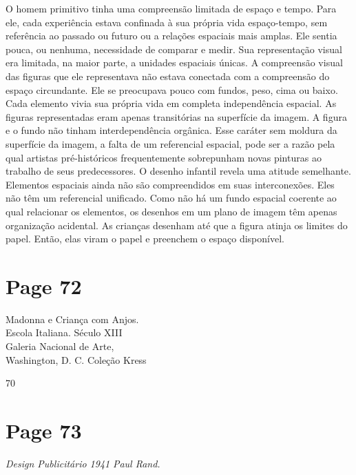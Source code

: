 \documentclass[a4paper]{article}
\begin{document}
O homem primitivo tinha uma compreensão limitada de espaço e tempo. Para ele, cada experiência estava confinada à sua própria vida espaço-tempo, sem referência ao passado ou futuro ou a relações espaciais mais amplas. Ele sentia pouca, ou nenhuma, necessidade de comparar e medir. Sua representação visual era limitada, na maior parte, a unidades espaciais únicas. A compreensão visual das figuras que ele representava não estava conectada com a compreensão do espaço circundante. Ele se preocupava pouco com fundos, peso, cima ou baixo. Cada elemento vivia sua própria vida em completa independência espacial. As figuras representadas eram apenas transitórias na superfície da imagem. A figura e o fundo não tinham interdependência orgânica. Esse caráter sem moldura da superfície da imagem, a falta de um referencial espacial, pode ser a razão pela qual artistas pré-históricos frequentemente sobrepunham novas pinturas ao trabalho de seus predecessores. O desenho infantil revela uma atitude semelhante. Elementos espaciais ainda não são compreendidos em suas interconexões. Eles não têm um referencial unificado. Como não há um fundo espacial coerente ao qual relacionar os elementos, os desenhos em um plano de imagem têm apenas organização acidental. As crianças desenham até que a figura atinja os limites do papel. Então, elas viram o papel e preenchem o espaço disponível.

\vfill
{}

\newpage
\section*{Page 72}

\begin{raggedright}
Madonna e Criança com Anjos. \\
Escola Italiana. Século XIII \\
Galeria Nacional de Arte, \\
Washington, D. C. Coleção Kress
\end{raggedright}
70

\newpage
\section*{Page 73}

\raggedright %

\textit{Design Publicitário 1941}
\textit{Paul Rand.}

\par\bigskip %
\end{document}
